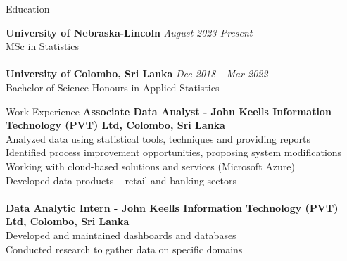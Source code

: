 \documentclass{resume} %
\begin{document}

\begin{rSection}{Education}


{\bf University of Nebraska-Lincoln} \hfill {\em August 2023-Present} 
\\ MSc in Statistics\\
\\{\bf University of Colombo, Sri Lanka} \hfill {\em Dec 2018 - Mar 2022} 
\\ Bachelor of Science Honours in Applied Statistics\\



\end{rSection}
\begin{rSection}{Work Experience}
{\bf Associate Data Analyst - John Keells Information Technology (PVT) Ltd, Colombo, Sri Lanka }
\\Analyzed data using statistical tools, techniques and providing reports\\
Identified process improvement opportunities, proposing system modifications\\
Working with cloud-based solutions and services (Microsoft Azure)\\
Developed data products – retail and banking sectors
\\
\\{\bf Data Analytic Intern - John Keells Information Technology (PVT) Ltd, Colombo, Sri Lanka }\\
Developed and maintained dashboards and databases   \\
Conducted research to gather data on specific domains

\end{rSection}
\end{document}

